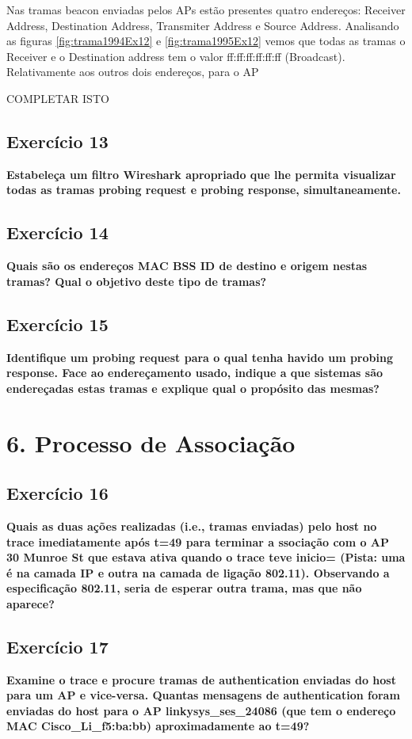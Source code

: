 \documentclass[a4paper]{report}
\begin{document}
Nas tramas beacon enviadas pelos APs estão presentes quatro endereços: Receiver
Address, Destination Address, Transmiter Address e Source Address. Analisando
as figuras \ref{fig:trama1994Ex12} e \ref{fig:trama1995Ex12} vemos que todas as
tramas o Receiver e o Destination address tem o valor ff:ff:ff:ff:ff:ff
(Broadcast). Relativamente aos outros dois endereços, para o AP 

COMPLETAR ISTO 

\section{Exercício 13}
\textbf{Estabeleça um filtro Wireshark apropriado que lhe permita visualizar
    todas as tramas probing request e probing response, simultaneamente.}\\

\section{Exercício 14}
\textbf{Quais são os endereços MAC BSS ID de destino e origem nestas tramas?
    Qual o objetivo deste tipo de tramas?}\\

\section{Exercício 15}
\textbf{Identifique um probing request para o qual tenha havido um probing
    response. Face ao endereçamento usado, indique a que sistemas são
    endereçadas estas tramas e explique qual o propósito das mesmas?}\\

\chapter{6. Processo de Associação}
\section{Exercício 16}
\textbf{Quais as duas ações realizadas (i.e., tramas enviadas) pelo host no
    trace imediatamente após t=49 para terminar a ssociação com o AP 30 Munroe
    St que estava ativa quando o trace teve inicio= (Pista: uma é na camada IP e
    outra na camada de ligação 802.11). Observando a especificação 802.11, seria
    de esperar outra trama, mas que não aparece?}\\

\section{Exercício 17}
\textbf{Examine o trace e procure tramas de authentication enviadas do host para
    um AP e vice-versa. Quantas mensagens de authentication foram enviadas do
    host para o AP linkysys\_ses\_24086 (que tem o endereço MAC
    Cisco\_Li\_f5:ba:bb) aproximadamente ao t=49?}\\
\end{document}
